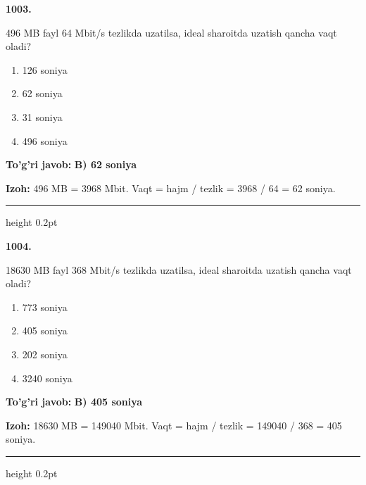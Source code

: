 \documentclass[10pt,a4paper,oneside]{article}
\begin{document}
\noindent\textbf{\color{ink}1003.}
\par
496 MB fayl 64 Mbit/s tezlikda uzatilsa, ideal sharoitda uzatish qancha vaqt oladi?
\begin{enumerate}[label=\Alph*),leftmargin=9mm]
\item 126 soniya
\item 62 soniya
\item 31 soniya
\item 496 soniya
\end{enumerate}
\begin{tcolorbox}[enhanced,breakable,colback=teal!4,colframe=teal!50!black,boxrule=0.5pt,arc=1.1mm,left=3mm,right=3mm,top=1.7mm,bottom=1.7mm,before skip=2mm,after skip=2mm]
\textbf{\color{teal}To'g'ri javob:} \textbf{B) 62 soniya}
\par\smallskip
\textbf{Izoh:} 496 MB = 3968 Mbit. Vaqt = hajm / tezlik = 3968 / 64 = 62 soniya.
\end{tcolorbox}
\vspace{2mm}\hrule height 0.2pt \vspace{3mm}

\noindent\textbf{\color{ink}1004.}
\par
18630 MB fayl 368 Mbit/s tezlikda uzatilsa, ideal sharoitda uzatish qancha vaqt oladi?
\begin{enumerate}[label=\Alph*),leftmargin=9mm]
\item 773 soniya
\item 405 soniya
\item 202 soniya
\item 3240 soniya
\end{enumerate}
\begin{tcolorbox}[enhanced,breakable,colback=teal!4,colframe=teal!50!black,boxrule=0.5pt,arc=1.1mm,left=3mm,right=3mm,top=1.7mm,bottom=1.7mm,before skip=2mm,after skip=2mm]
\textbf{\color{teal}To'g'ri javob:} \textbf{B) 405 soniya}
\par\smallskip
\textbf{Izoh:} 18630 MB = 149040 Mbit. Vaqt = hajm / tezlik = 149040 / 368 = 405 soniya.
\end{tcolorbox}
\vspace{2mm}\hrule height 0.2pt \vspace{3mm}
\end{document}
